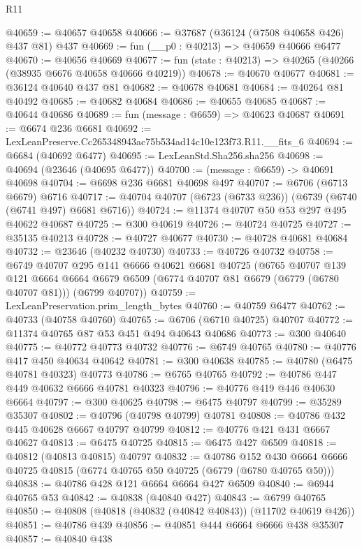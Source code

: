 \begin{lexlean}{R11}
\begin{coremodule}
@40659 := @40657 @40658
@40666 := @37687 (@36124 (@7508 @40658 @426) @437 @81) @437
@40669 := fun (__p0 : @40213) => @40659 @40666 @6477
@40670 := @40656 @40669
@40677 := fun (state : @40213) => @40265 (@40266 (@38935 @6676 @40658 @40666 @40219))
@40678 := @40670 @40677
@40681 := @36124 @40640 @437 @81
@40682 := @40678 @40681
@40684 := @40264 @81 @40492
@40685 := @40682 @40684
@40686 := @40655 @40685
@40687 := @40644 @40686
@40689 := fun (message : @6659) => @40623 @40687
@40691 := @6674 @236 @6681
@40692 := LexLeanPreserve.Cc265348943ac75b534ad14c10e123f73.R11.__fits_6
@40694 := @6684 (@40692 @6477)
@40695 := LexLeanStd.Sha256.sha256
@40698 := @40694 (@23646 (@40695 @6477))
@40700 := (message : @6659) -> @40691 @40698
@40704 := @6698 @236 @6681 @40698 @497
@40707 := @6706 (@6713 @6679) @6716
@40717 := @40704 @40707 (@6723 (@6733 @236)) (@6739 (@6740 (@6741 @497) @6681 @6716))
@40724 := @11374 @40707 @50 @53 @297 @495 @40622 @40687
@40725 := @300 @40619
@40726 := @40724 @40725
@40727 := @35135 @40213
@40728 := @40727 @40677
@40730 := @40728 @40681 @40684
@40732 := @23646 (@40232 @40730)
@40733 := @40726 @40732
@40758 := @6749
    @40707
    @295
    @141
    @6666
    @40621
    @6681
    @40725
    (@6765
      @40707
      @139
      @121
      @6664
      @6664
      @6679
      @6509
      (@6774 @40707 @81 @6679 (@6779 (@6780 @40707 @81)))
      (@6799 @40707))
@40759 := LexLeanPreservation.prim_length_bytes
@40760 := @40759 @6477
@40762 := @40733 (@40758 @40760)
@40765 := @6706 (@6710 @40725) @40707
@40772 := @11374 @40765 @87 @53 @451 @494 @40643 @40686
@40773 := @300 @40640
@40775 := @40772 @40773 @40732
@40776 := @6749 @40765
@40780 := @40776 @417 @450 @40634 @40642
@40781 := @300 @40638
@40785 := @40780 (@6475 @40781 @40323) @40773
@40786 := @6765 @40765
@40792 := @40786 @447 @449 @40632 @6666 @40781 @40323
@40796 := @40776 @419 @446 @40630 @6664
@40797 := @300 @40625
@40798 := @6475 @40797
@40799 := @35289 @35307
@40802 := @40796 (@40798 @40799) @40781
@40808 := @40786 @432 @445 @40628 @6667 @40797 @40799
@40812 := @40776 @421 @431 @6667 @40627
@40813 := @6475 @40725
@40815 := @6475 @427 @6509
@40818 := @40812 (@40813 @40815) @40797
@40832 := @40786
    @152
    @430
    @6664
    @6666
    @40725
    @40815
    (@6774 @40765 @50 @40725 (@6779 (@6780 @40765 @50)))
@40838 := @40786 @428 @121 @6664 @6664 @427 @6509
@40840 := @6944 @40765 @53
@40842 := @40838 (@40840 @427)
@40843 := @6799 @40765
@40850 := @40808 (@40818 (@40832 (@40842 @40843)) (@11702 @40619 @426))
@40851 := @40786 @439
@40856 := @40851 @444 @6664 @6666 @438 @35307
@40857 := @40840 @438

\end{coremodule}
\end{lexlean}
